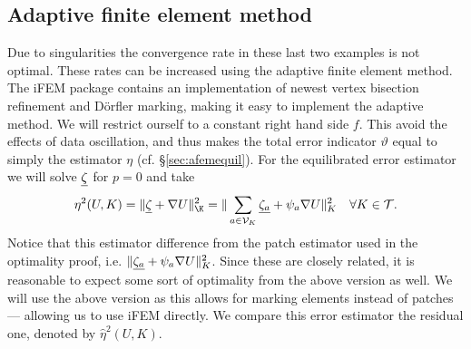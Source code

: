 \documentclass[thesis.tex]{subfiles}
\begin{document}
\subsection{Adaptive finite element method}
Due to singularities the convergence rate in these last two examples is not optimal. 
These rates can be increased using the adaptive finite element method. The iFEM package contains
an implementation of newest vertex bisection refinement and D\"orfler marking, making it easy
to implement the adaptive method. We will restrict ourself to a constant right hand side $f$. This
avoid the effects of data oscillation, and thus makes the total error indicator $\vartheta$ equal to 
simply the estimator $\eta$ (cf. \S\ref{sec:afemequil}). For the equilibrated error estimator we will
solve $\underline{\zeta}$ for $p=0$ and take
\[
  \eta^2(U, K) = \uanorm{ \v{\zeta} + \nabla U}^2_{\K} = \uanorm{\sum_{a \in \V_K} \v{\zeta_a} + \psi_a \nabla U}^2_{K} \quad \forall K \in \T.
\]
Notice that this estimator difference from the patch estimator used in the optimality proof, i.e. $\| \underline{\zeta_a} + \psi_a \nabla U \|^2_K$.
Since these are closely related, it is reasonable to expect some sort of optimality from the above version as well. We will use
the above version as this allows for marking elements instead of patches --- allowing us to use iFEM directly.
We compare this error estimator the residual one, denoted by $\hat \eta^2(U,K)$.
\end{document}
